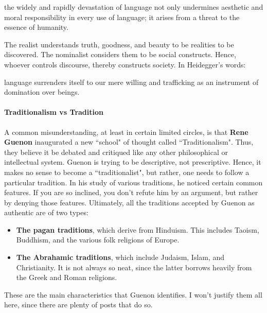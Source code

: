 \begin{quotex}
the widely and rapidly devastation of language not only undermines aesthetic and moral responsibility in every use of language; it arises from a threat to the essence of humanity.

\end{quotex}
The realist understands truth, goodness, and beauty to be realities to be discovered. The nominalist considers them to be social constructs. Hence, whoever controls discourse, thereby constructs society. In Heidegger's words:

\begin{quotex}
language surrenders itself to our mere willing and trafficking as an instrument of domination over beings.

\end{quotex}
\paragraph{Traditionalism vs Tradition}
A common misunderstanding, at least in certain limited circles, is that \textbf{Rene Guenon} inaugurated a new ``school" of thought called ``Traditionalism". Thus, they believe it be debated and critiqued like any other philosophical or intellectual system. Guenon is trying to be descriptive, not prescriptive. Hence, it makes no sense to become a ``traditionalist", but rather, one needs to follow a particular tradition. In his study of various traditions, he noticed certain common features. If you are so inclined, you don't refute him by an argument, but rather by denying those features. Ultimately, all the traditions accepted by Guenon as authentic are of two types:

\begin{itemize}
\item \textbf{The pagan traditions}, which derive from Hinduism. This includes Taoism, Buddhism, and the various folk religions of Europe. 
\item \textbf{The Abrahamic traditions}, which include Judaism, Islam, and Christianity. It is not always so neat, since the latter borrows heavily from the Greek and Roman religions. 
\end{itemize}
These are the main characteristics that Guenon identifies. I won't justify them all here, since there are plenty of posts that do so.

